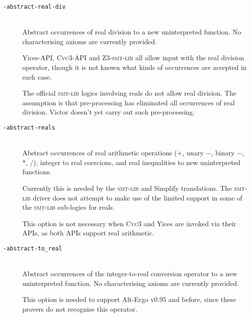 \documentclass[12pt,fleqn]{article}
\newcommand{\cvcthree}{\textsc{Cvc}3}
\newcommand{\zthree}{\textsc{Z}3}
\newcommand{\yices}{Yices}
\newcommand{\altergo}{Alt-Ergo}
\newcommand{\smtlib}{\textsc{smt-lib}}
\newcommand{\optionb}[1]{\item[\texttt{-{#1}}]\ \\}
\begin{document}
\begin{description}

\optionb{abstract-real-div}
  Abstract occurrences of real division to a new uninterpreted function.
  No characterising axioms are currently provided.

  \yices-API, \cvcthree-API and \zthree-\smtlib{} all allow input 
  with the real division operator, though it is not known what kinds of
  occurrences are accepted in each case.

  The official \smtlib{} logics involving reals do not allow real division.
  The assumption is that pre-processing has eliminated all occurrences of
  real division.  Victor doesn't yet carry out such pre-processing.

\optionb{abstract-reals}
  Abstract occurrences of real arithmetic operations 
  ($+$, unary $-$, binary $-$, $*$, $/$), integer to real coercions, and
  real inequalities to new uninterpreted functions.

  Currently this is needed by the \smtlib{} and Simplify translations.
  The \smtlib{} driver does not attempt to make use of the limited
  support in some of the \smtlib{} sub-logics for reals.

  This option is not necessary when \cvcthree{} and \yices{} are
  invoked via their APIs, as both APIs support real arithmetic.

\optionb{abstract-to\_real}
  Abstract occurrences of the integer-to-real conversion operator to a
  new uninterpreted function.  No characterising axioms are currently
  provided.  

  This option is needed to support \altergo{} v0.95 and before, since
  these provers do not recognise this operator.
  


\end{description}
\end{document}
